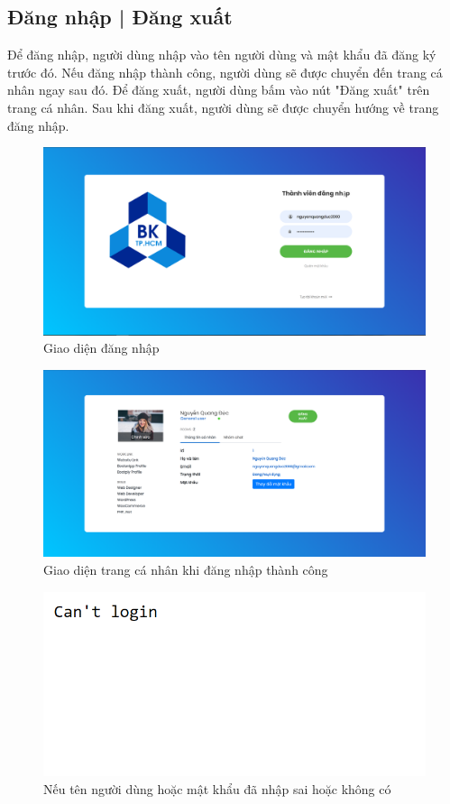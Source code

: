 \documentclass[a4paper]{article}
\begin{document}
	\subsection{Đăng nhập | Đăng xuất}
	Để đăng nhập, người dùng nhập vào tên người dùng và mật khẩu đã đăng ký trước đó. Nếu đăng nhập thành công, người dùng sẽ được chuyển đến trang cá nhân ngay sau đó.\linebreak
	Để đăng xuất, người dùng bấm vào nút "Đăng xuất" trên trang cá nhân. Sau khi đăng xuất, người dùng sẽ được chuyển hướng về trang đăng nhập.
	
	\begin{figure}[H]
		\centering
		\includegraphics[scale=0.36]{login.png}
		\caption{Giao diện đăng nhập}
		\label{F:login}
	\end{figure}
	
	\begin{figure}[H]
		\centering
		\includegraphics[scale=0.36]{profile_manager.png}
		\caption{Giao diện trang cá nhân khi đăng nhập thành công}
		\label{F:profile_manager_login}
	\end{figure}
	
	\begin{figure}[H]
		\centering
		\includegraphics[scale=1]{can_not_login.png}
		\caption{Nếu tên người dùng hoặc mật khẩu đã nhập sai hoặc không có}
		\label{F:can_not_login}
	\end{figure}
	
\end{document}
